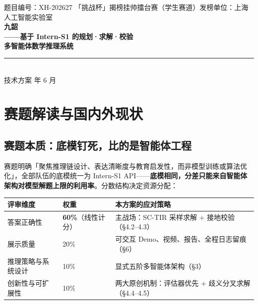 \documentclass[11pt, a4paper]{ctexart}
\newcommand{\hl}[1]{\textcolor{accentred}{\textbf{#1}}}
\begin{document}
\begin{center}
{\small 题目编号：XH-202627 \quad 「挑战杯」揭榜挂帅擂台赛（学生赛道）\quad 发榜单位：上海人工智能实验室}\\[1.8em]
{\LARGE\bfseries 九韶}\\[0.6em]
{\large\bfseries ——基于 Intern-S1 的规划·求解·校验\\[0.2em]多智能体数学推理系统}\\[1.2em]
{\color{rulelight}\rule{0.85\textwidth}{0.6pt}}\\[1.2em]
{\small 技术方案  年 6 月}
\end{center}

\vspace{0.5em}

\section{赛题解读与国内外现状}

\subsection{赛题本质：底模钉死，比的是智能体工程}

赛题明确「聚焦推理链设计、表达清晰度与教育启发性，而非模型训练或算法优化」，全部队伍的底模统一为 Intern-S1 API——\hl{底模相同，分差只能来自智能体架构对模型解题上限的利用率}。分数结构决定资源分配：

\begin{center}
\small
\begin{tabular}{llp{}}
\toprule
\textbf{评审维度} & \textbf{权重} & \textbf{本方案的应对策略} \\
\midrule
答案正确性 & \hl{60\%}（线性计分） & 主战场：SC-TIR 采样求解 + 接地校验（\S4.2--4.3） \\
展示质量 & 20\% & 可交互 Demo、视频、报告、全程日志留痕（\S6） \\
推理策略与系统设计 & 10\% & 显式五阶多智能体架构（\S3） \\
创新性与可扩展性 & 10\% & 两大原创机制：评估器优先 + 歧义分叉求解（\S4.4--4.5） \\
\bottomrule
\end{tabular}
\end{center}
\end{document}
